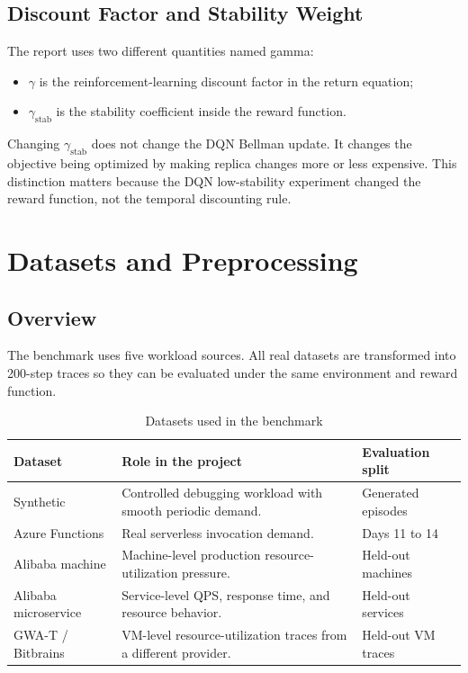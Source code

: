 \documentclass{rapportINPTCLOUD}
\begin{document}
\section{Discount Factor and Stability Weight}

The report uses two different quantities named gamma:

\begin{itemize}
  \item $\gamma$ is the reinforcement-learning discount factor in the return equation;
  \item $\gamma_{\text{stab}}$ is the stability coefficient inside the reward function.
\end{itemize}

Changing $\gamma_{\text{stab}}$ does not change the DQN Bellman update. It changes the objective being optimized by making replica changes more or less expensive. This distinction matters because the DQN low-stability experiment changed the reward function, not the temporal discounting rule.

\chapter{Datasets and Preprocessing}
\label{chap:data}

\section{Overview}

The benchmark uses five workload sources. All real datasets are transformed into 200-step traces so they can be evaluated under the same environment and reward function.

\begin{table}[H]
\centering
\begin{tabularx}{\textwidth}{lYl}
\toprule
\textbf{Dataset} & \textbf{Role in the project} & \textbf{Evaluation split} \\
\midrule
Synthetic & Controlled debugging workload with smooth periodic demand. & Generated episodes \\
Azure Functions & Real serverless invocation demand. & Days 11 to 14 \\
Alibaba machine & Machine-level production resource-utilization pressure. & Held-out machines \\
Alibaba microservice & Service-level QPS, response time, and resource behavior. & Held-out services \\
GWA-T / Bitbrains & VM-level resource-utilization traces from a different provider. & Held-out VM traces \\
\bottomrule
\end{tabularx}
\caption{Datasets used in the benchmark}
\end{table}
\end{document}
